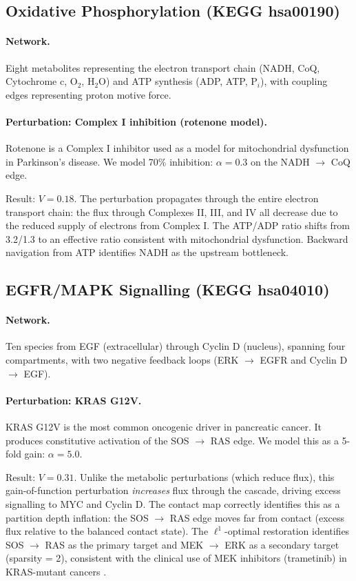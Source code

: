 \documentclass[11pt,twocolumn]{article}
\theoremstyle{plain}
\theoremstyle{definition}
\begin{document}
\subsection{Oxidative Phosphorylation (KEGG hsa00190)}

\paragraph{Network.} Eight metabolites representing the electron transport chain
(NADH, CoQ, Cytochrome c, O$_2$, H$_2$O) and ATP synthesis (ADP, ATP, P$_i$),
with coupling edges representing proton motive force.

\paragraph{Perturbation: Complex I inhibition (rotenone model).}
Rotenone is a Complex I inhibitor used as a model for mitochondrial dysfunction
in Parkinson's disease. We model 70\% inhibition: $\alpha = 0.3$ on the
NADH $\to$ CoQ edge.

Result: $V = 0.18$. The perturbation propagates through the entire electron
transport chain: the flux through Complexes II, III, and IV all decrease due to
the reduced supply of electrons from Complex I. The ATP/ADP ratio shifts from
3.2/1.3 to an effective ratio consistent with mitochondrial dysfunction.
Backward navigation from ATP identifies NADH as the upstream bottleneck.

\subsection{EGFR/MAPK Signalling (KEGG hsa04010)}

\paragraph{Network.} Ten species from EGF (extracellular) through Cyclin D
(nucleus), spanning four compartments, with two negative feedback loops
(ERK $\to$ EGFR and Cyclin D $\to$ EGF).

\paragraph{Perturbation: KRAS G12V.}
KRAS G12V is the most common oncogenic driver in pancreatic cancer. It produces
constitutive activation of the SOS $\to$ RAS edge. We model this as a 5-fold
gain: $\alpha = 5.0$.

Result: $V = 0.31$. Unlike the metabolic perturbations (which reduce flux), this
gain-of-function perturbation \emph{increases} flux through the cascade, driving
excess signalling to MYC and Cyclin D. The contact map correctly identifies this
as a partition depth inflation: the SOS $\to$ RAS edge moves far from contact
(excess flux relative to the balanced contact state). The $\ell^1$-optimal
restoration identifies SOS $\to$ RAS as the primary target and MEK $\to$ ERK as
a secondary target (sparsity = 2), consistent with the clinical use of MEK
inhibitors (trametinib) in KRAS-mutant cancers \cite{hopkins2008network}.
\end{document}
